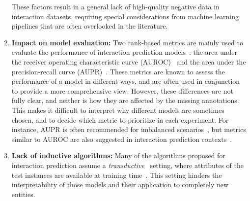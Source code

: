 \begin{enumerate}
    These factors result in a general lack of high-quality negative data in interaction datasets, requiring special considerations from machine learning pipelines that are often overlooked in the literature.
    \item \textbf{Impact on model evaluation:} Two rank-based metrics are mainly used to evaluate the performance of interaction prediction models~\cite{lu2011link,zhou2021progresses,pahikkala2015more,chen2018machine}: the area under the receiver operating characteristic curve (AUROC)~\cite{davis2006relationship,hand2009measuring} and the area under the precision-recall curve (AUPR)~\cite{davis2006relationship,ozenne2015precision,flach2015precisionrecallgain}. These metrics are known to assess the performance of a model in different ways, and are often used in conjunction to provide a more comprehensive view.
    However, these differences are not fully clear, and neither is how they are affected by the missing annotations.
    This makes it difficult to interpret why different models are sometimes chosen,
    and to decide which metric to prioritize in each experiment. For instance, AUPR is often recommended for imbalanced scenarios~\cite{davis2006relationship,hand2009measuring,he2009learning,ezzat2019computational}, but metrics similar to AUROC are also suggested in interaction prediction contexts~\cite{pahikkala2015more,johnsonlogistic,hao2019opensource,ezzat2019computational,yu2020fpscdtia}.
    \item \textbf{Lack of inductive algorithms:} Many of the algorithms proposed for interaction prediction assume a \emph{transductive}~\cite{chapelle2006semisupervised} setting, where attributes of the test instances are available at training time~\cite{pahikkala2015more,ezzat2019computational}. This setting hinders the interpretability of those models and their application to completely new entities.
\end{enumerate}

